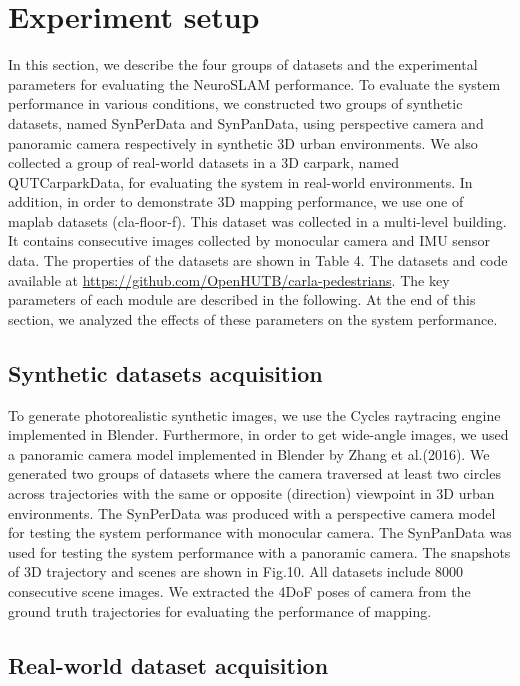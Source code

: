 \section{Experiment setup}

In this section, we describe the four groups of datasets and the experimental parameters for evaluating the NeuroSLAM performance.
To evaluate the system performance in various conditions, we constructed two groups of synthetic datasets, named SynPerData and SynPanData, using perspective camera and panoramic camera respectively in synthetic 3D urban environments.
We also collected a group of real-world datasets in a 3D carpark, named QUTCarparkData, for evaluating the system in real-world environments.
In addition, in order to demonstrate 3D mapping performance, we use one of maplab datasets (cla-floor-f).
This dataset was collected in a multi-level building.
It contains consecutive images collected by monocular camera and IMU sensor data.
The properties of the datasets are shown in Table 4.
The datasets and code available at \href{https://github.com/OpenHUTB/carla-pedestrians}{https://github.com/OpenHUTB/carla-pedestrians}.
The key parameters of each module are described in the following.
At the end of this section, we analyzed the effects of these parameters on the system performance.


\subsection{Synthetic datasets acquisition} \label{sec:Dataset}

\hspace{1pc}To generate photorealistic synthetic images, we use the Cycles raytracing engine implemented in Blender.
Furthermore, in order to get wide-angle images, we used a panoramic camera model implemented in Blender by Zhang et al.(2016).
We generated two groups of datasets where the camera traversed at least two circles across trajectories with the same or opposite (direction) viewpoint in 3D urban environments.
The SynPerData was produced with a perspective camera model for testing the system performance with monocular camera.
The SynPanData was used for testing the system performance with a panoramic camera.
The snapshots of 3D trajectory and scenes are shown in Fig.10.
All datasets include 8000 consecutive scene images.
We extracted the 4DoF poses of camera from the ground truth trajectories for evaluating the performance of mapping.


\subsection{Real-world dataset acquisition}

